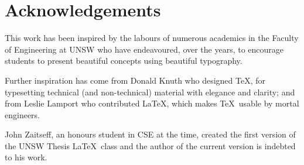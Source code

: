 \chapter*{Acknowledgements}\label{ack}

This work has been inspired by the labours of numerous academics in
the Faculty of Engineering at UNSW who have endeavoured, over the years, to
encourage students to present beautiful concepts using beautiful
typography.

Further inspiration has come from Donald Knuth who designed \TeX, for
typesetting technical (and non-technical) material with elegance and
clarity; and from Leslie Lamport who contributed \LaTeX, which makes
\TeX\ usable by mortal engineers.

John Zaitseff, an honours student in CSE at the time, created the
first version of the UNSW Thesis \LaTeX\ class and the author of the
current version is indebted to his work.

